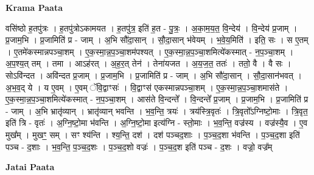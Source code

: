 \documentclass[17pt]{extarticle}
\begin{document}
\textbf{Krama Paata} \newline

वसि॑ष्ठो ह॒तपु॑त्रः । ह॒तपु॑त्रोऽकामयत । ह॒तपु॑त्र॒ इति॑ ह॒त - पु॒त्रः॒ । अ॒का॒म॒य॒त॒ वि॒न्देय॑ । वि॒न्देय॑ प्र॒जाम् । प्र॒जाम॒भि । प्र॒जामिति॑ प्र - जाम् । अ॒भि सौ॑दा॒सान् । सौ॒दा॒सान् भ॑वेयम् । भ॒वे॒य॒मिति॑ । इति॒ सः । स ए॒तम् । ए॒तमे॑कस्मान्नपञ्चा॒शम् । ए॒क॒स्मा॒न्न॒प॒ञ्चा॒शम॑पश्यत् । ए॒क॒स्मा॒न्न॒प॒ञ्चा॒शमित्ये॑कस्मात् - न॒प॒ञ्चा॒शम् । अ॒प॒श्य॒त् तम् । तमा । आऽह॑रत् । अ॒ह॒र॒त् तेन॑ । तेना॑यजत । अ॒य॒ज॒त॒ ततः॑ । ततो॒ वै । वै सः । सोऽवि॑न्दत । अवि॑न्दत प्र॒जाम् । प्र॒जाम॒भि । प्र॒जामिति॑ प्र - जाम् । अ॒भि सौ॑दा॒सान् । सौ॒दा॒सान॑भवत् । अ॒भ॒व॒द् ये । य ए॒वम् । ए॒वम् ॅवि॒द्वाꣳसः॑ । वि॒द्वाꣳस॑ एकस्मान्नपञ्चा॒शम् । ए॒क॒स्मा॒न्न॒प॒ञ्चा॒शमास॑ते । ए॒क॒स्मा॒न्न॒प॒ञ्चा॒शमित्ये॑कस्मात् - न॒प॒ञ्चा॒शम् । आस॑ते वि॒न्दन्ते᳚ । वि॒न्दन्ते᳚ प्र॒जाम् । प्र॒जाम॒भि । प्र॒जामिति॑ प्र - जाम् । अ॒भि भ्रातृ॑व्यान् । भ्रातृ॑व्यान् भवन्ति । भ॒व॒न्ति॒ त्रयः॑ । त्रय॑स्त्रि॒वृतः॑ । त्रि॒वृतो᳚ऽग्निष्टो॒माः । त्रि॒वृत॒ इति॑ त्रि - वृतः॑ । अ॒ग्नि॒ष्टो॒मा भ॑वन्ति । अ॒ग्नि॒ष्टो॒मा इत्य॑ग्नि - स्तो॒माः । भ॒व॒न्ति॒ वज्र॑स्य । वज्र॑स्यै॒व । ए॒व मुख᳚म् । मुखꣳ॒॒ सम् । सꣳ श्य॑न्ति । श्य॒न्ति॒ दश॑ । दश॑ पञ्चद॒शाः । प॒ञ्च॒द॒शा भ॑वन्ति । प॒ञ्च॒द॒शा इति॑ पञ्च - द॒शाः । भ॒व॒न्ति॒ प॒ञ्च॒द॒शः । प॒ञ्च॒द॒शो वज्रः॑ । प॒ञ्च॒द॒श इति॑ पञ्च - द॒शः । वज्रो॒ वज्र᳚म् \newline

\textbf{Jatai Paata} \newline
\end{document}
